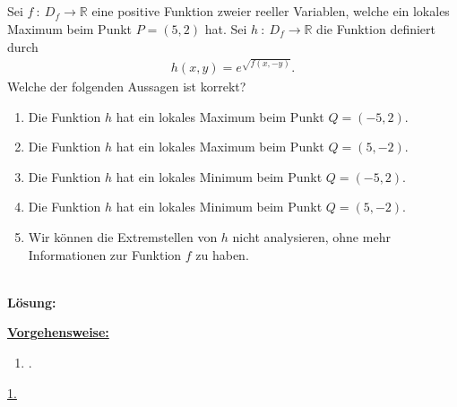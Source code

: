 \subsection*{}
Sei $ f \ : \ D_f \to \mathbb{R} $ eine positive Funktion zweier reeller Variablen, welche ein lokales Maximum beim Punkt $ P = (5,2)  $ hat.
Sei $ h  \ : \ D_f \to \mathbb{R} $ die Funktion definiert durch
\begin{align*}
	h(x,y) = e^{\sqrt{f(x,-y)}}.
\end{align*} 
Welche der folgenden Aussagen ist korrekt?
\renewcommand{\labelenumi}{(\alph{enumi})}
\begin{enumerate}
	\item Die Funktion $ h $ hat ein lokales Maximum beim Punkt $ Q = (-5,2). $
	\item Die Funktion $ h $ hat ein lokales Maximum beim Punkt $ Q = (5,-2). $
	\item Die Funktion $ h $ hat ein lokales Minimum beim Punkt $ Q = (-5,2). $
	\item Die Funktion $ h $ hat ein lokales Minimum beim Punkt $ Q = (5,-2). $
	\item Wir können die Extremstellen von $ h $ nicht analysieren, ohne mehr Informationen zur Funktion $ f $ zu haben.
\end{enumerate}
\ \\
\textbf{Lösung:}
\begin{mdframed}
	\underline{\textbf{Vorgehensweise:}}
	\renewcommand{\labelenumi}{\theenumi.}
	\begin{enumerate}
		\item .
	\end{enumerate}
\end{mdframed}
\underline{1. }\\



\newpage
